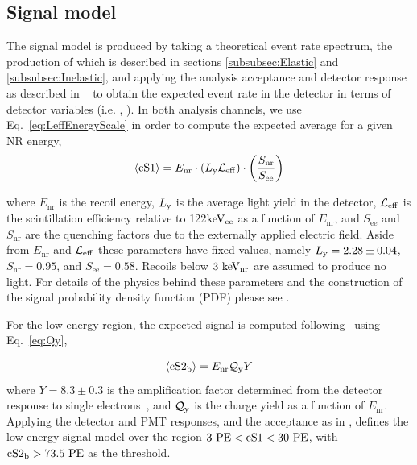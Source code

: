 \subsection{Signal model}
\label{subsec:SignalModel}
The signal model is produced by taking a theoretical event rate spectrum, the production of which is described in sections \ref{subsubsec:Elastic} and \ref{subsubsec:Inelastic}, and applying the analysis acceptance and detector response as described in ~\cite{Aprile:2012vw}  to obtain the expected event rate in the detector in terms of detector variables (i.e. \cSi{}, \cSiib{}). 
In both analysis channels, we use Eq.~\ref{eq:LeffEnergyScale} in order to compute the expected average \cSi{} for a given NR energy,
\begin{equation}
\label{eq:LeffEnergyScale}
	\langle \mathrm{cS1} \rangle = E_{\mathrm{nr}} \cdot (L_{\mathrm{y}} \mathcal{L}_{\mathrm{eff}}) \cdot   \left(\frac{S_\mathrm{nr}}{S_\mathrm{ee}}\right) 
\end{equation}

where $E_\mathrm{nr}$ is the recoil energy, $L_{\mathrm{y}}$ is the average light yield in the detector, $\mathcal{L}_{\mathrm{eff}}$ is the scintillation efficiency relative to 122$\mathrm{keV_\mathrm{ee}}$ as a function of $E_\mathrm{nr}$, and $S_\mathrm{ee}$ and $S_\mathrm{nr}$ are the quenching factors due to the externally applied electric field. Aside from $E_\mathrm{nr}$ and $\mathcal{L}_{\mathrm{eff}}$ these parameters have fixed values, namely $L_{\mathrm{y}} = 2.28 \pm 0.04$, $S_\mathrm{nr} = 0.95$, and $S_\mathrm{ee} = 0.58$. Recoils below $3~\mathrm{keV_\mathrm{nr}}$ are assumed to produce no light. For details of the physics behind these parameters and the construction of the signal probability density function (PDF) please see \cite{Aprile:2012vw,xe100_run_combination}. 

For the low-energy region, the expected \cSiib{} signal is computed following~\cite{DataMCXenon} using Eq.~\ref{eq:Qy},


\begin{equation}
\label{eq:Qy}
	\langle \mathrm{cS2}_\mathrm{b} \rangle = E_{\mathrm{nr}}\mathcal{Q}_{\mathrm{y}} Y   
\end{equation}
where $Y = 8.3 \pm 0.3$ 
is the amplification factor determined from the detector response to single electrons~\cite{XenonSingleElectron}, and $\mathcal{Q}_{\mathrm{y}}$ is the charge yield as a function of $E_\mathrm{nr}$. Applying the detector and PMT responses, and the acceptance as in \cite{xe100_run_combination}, defines the low-energy signal model over the region $3~\mathrm{PE} < \mathrm{cS1}{} < 30~\mathrm{PE}$, with $\mathrm{cS2}_\mathrm{b}{} > 73.5~\mathrm{PE}$ as the \Sii{} threshold.

